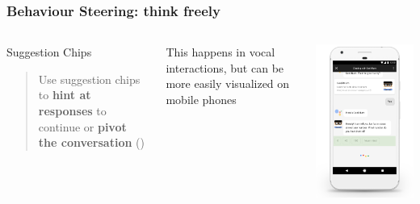 \documentclass{beamer}
\begin{document}
\begin{frame}[allowframebreaks]
\frametitle{Behaviour Steering: think freely}

	\begin{columns}
			\begin{block}{Suggestion Chips}
		 		\begin{quote}
		 			Use suggestion chips to \textbf{hint at responses} to continue or \textbf{pivot the conversation} (\cite{googleactions})
		 		\end{quote}
		 			
	 		\end{block}
 		\bigskip
 		
 		This happens in vocal interactions, but can be more easily visualized on mobile phones
	 		
			\centering
			\includegraphics[width=1.1\linewidth]{images/suggestion-chip}
	\end{columns}
\framebreak


\end{frame}
\end{document}
